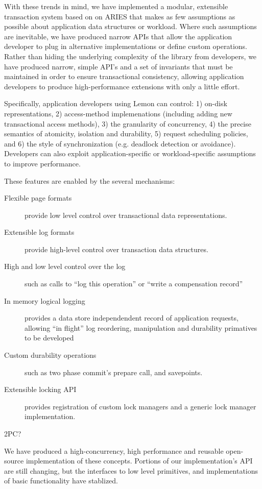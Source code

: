 \documentclass[letterpaper,twocolumn,english]{article}
\newcommand{\yad}{Lemon\xspace}
\begin{document}
With these trends in mind, we have implemented a modular, extensible
transaction system based on on ARIES that makes as few assumptions as
possible about application data structures or workload. Where such
assumptions are inevitable, we have produced narrow APIs that allow
the application developer to plug in alternative implementations or
define custom operations. Rather than hiding the underlying complexity
of the library from developers, we have produced narrow, simple API's
and a set of invariants that must be maintained in order to ensure
transactional consistency, allowing application developers to produce
high-performance extensions with only a little effort.  

Specifically, application developers using \yad can control: 1)
on-disk representations, 2) access-method implemenations (including
adding new transactional access methods), 3) the granularity of
concurrency, 4) the precise semantics of atomicity, isolation and
durability, 5) request scheduling policies, and 6) the style of
synchronization (e.g. deadlock detection or avoidance).  Developers
can also exploit application-specific or workload-specific assumptions
to improve performance.

These features are enabled by the several mechanisms:
\begin{description}
\item[Flexible page formats] provide low level control over 
      transactional data representations.
\item[Extensible log formats] provide high-level control over
      transaction data structures.
\item [High and low level control over the log] such as calls to ``log this
      operation'' or ``write a compensation record''
\item [In memory logical logging] provides a data store independendent
      record of application requests, allowing ``in flight'' log
      reordering, manipulation and durability primatives to be
      developed
\item[Custom durability operations] such as two phase commit's
      prepare call, and savepoints.
\item[Extensible locking API] provides registration of custom lock managers
      and a generic lock manager implementation.
\item[2PC?]
\end{description}

We have produced a high-concurrency, high performance and reusable
open-source implementation of these concepts.  Portions of our
implementation's API are still changing, but the interfaces to low
level primitives, and implementations of basic functionality have
stablized.  
\end{document}
